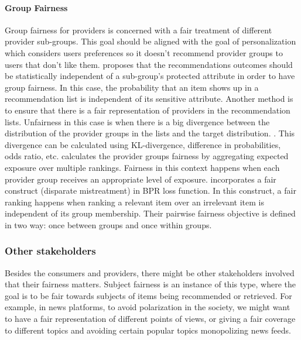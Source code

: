 \paragraph{Group Fairness}
Group fairness for providers is concerned with a fair treatment of different provider sub-groups. This goal should be aligned with the goal of personalization which considers users preferences so it doesn't recommend provider groups to users that don't like them. \cite{kamishima2018recommendation} proposes that the recommendations outcomes should be statistically independent of a sub-group's protected attribute in order to have group fairness. In this case, the probability that an item shows up in a recommendation list is independent of its sensitive attribute.
Another method is to ensure that there is a fair representation of providers in the recommendation lists. Unfairness in this case is when there is a big divergence between the distribution of the provider groups in the lists and the target distribution. \cite{yang2017measuring,das2019conceptual}. This divergence can be calculated using KL-divergence, difference in probabilities, odds ratio, etc. \cite{biega2018equity} calculates the provider groups fairness by aggregating expected exposure over multiple rankings. Fairness in this context happens when each provider group receives an appropriate level of exposure. \cite{beutel2019fairness} incorporates a fair construct (disparate mistreatment) in BPR\cite{rendlebpr2009} loss function. In this construct, a fair ranking happens when ranking a relevant item over an irrelevant item is independent of its group membership. Their pairwise fairness objective is defined in two way: once between groups and once within groups.
    
\subsubsection{Other stakeholders}     
Besides the consumers and providers, there might be other stakeholders involved that their fairness matters. Subject fairness is an instance of this type, where the goal is to be fair towards subjects of items being recommended or retrieved. For example, in news platforms, to avoid polarization in the society, we might want to have a fair representation of different points of views, or giving a fair coverage to different topics and avoiding certain popular topics monopolizing news feeds.

